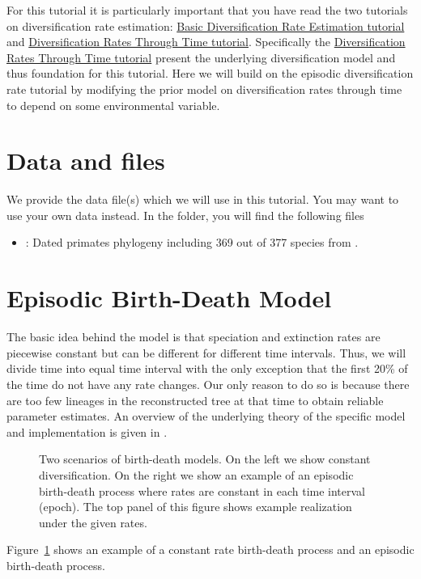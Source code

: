 For this tutorial it is particularly important that you have read the two tutorials on diversification rate estimation: \href{https://github.com/revbayes/revbayes_tutorial/raw/master/tutorial_TeX/RB_DiversificationRate_Tutorial/RB_DiversificationRate_Tutorial.pdf}{Basic Diversification Rate Estimation tutorial} and \href{https://github.com/revbayes/revbayes_tutorial/raw/master/tutorial_TeX/RB_DiversificationRate_Episodic_Tutorial/RB_DiversificationRate_Episodic_Tutorial.pdf}{Diversification Rates Through Time tutorial}.
Specifically the \href{https://github.com/revbayes/revbayes_tutorial/raw/master/tutorial_TeX/RB_DiversificationRate_Episodic_Tutorial/RB_DiversificationRate_Episodic_Tutorial.pdf}{Diversification Rates Through Time tutorial} present the underlying diversification model and thus foundation for this tutorial.
Here we will build on the episodic diversification rate tutorial by modifying the prior model on diversification rates through time to depend on some environmental variable.

\section{Data and files}

We provide the data file(s) which we will use in this tutorial.
You may want to use your own data instead.
In the  folder, you will find the following files
\begin{itemize}
\item {}: Dated primates phylogeny including 369 out of 377 species from \cite{Springer2012}.
\end{itemize}




\bigskip
\section{Episodic Birth-Death Model}

The basic idea behind the model is that speciation and extinction rates are piecewise constant but can be different for different time intervals.
Thus, we will divide time into equal time interval with the only exception that the first 20\% of the time do not have any rate changes.
Our only reason to do so is because there are too few lineages in the reconstructed tree at that time to obtain reliable parameter estimates.
An overview of the underlying theory of the specific model and implementation is given in \cite{Hoehna2015a}.
\begin{figure}[h!]
\centering
{}
\caption{\small Two scenarios of birth-death models. On the left we show constant diversification. On the right we show an example of an episodic birth-death process where rates are constant in each time interval (epoch). The top panel of this figure shows example realization under the given rates.}
\label{fig:EBD}
\end{figure}
Figure~\ref{fig:EBD} shows an example of a constant rate birth-death process and an episodic birth-death process.

